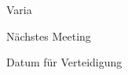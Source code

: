 \begin{frame}[t]{Varia}
  \begin{bigitemize}{3mm}
    \item Nächstes Meeting

    \item Datum für Verteidigung
  \end{bigitemize}
\end{frame}
